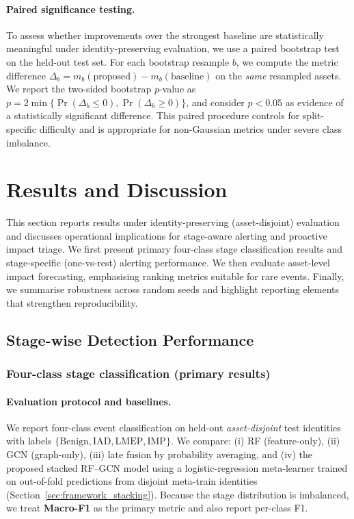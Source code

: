 \documentclass[pdflatex,sn-mathphys-num]{sn-jnl}
\theoremstyle{thmstyleone}%
\theoremstyle{thmstyletwo}%
\theoremstyle{thmstylethree}%
\begin{document}
\paragraph{Paired significance testing.}
To assess whether improvements over the strongest baseline are statistically meaningful under identity-preserving evaluation, we use a paired bootstrap test on the held-out test set.
For each bootstrap resample $b$, we compute the metric difference $\Delta_b = m_b(\text{proposed}) - m_b(\text{baseline})$ on the \emph{same} resampled assets.
We report the two-sided bootstrap $p$-value as
$p = 2\min\{\Pr(\Delta_b \le 0), \Pr(\Delta_b \ge 0)\}$,
and consider $p<0.05$ as evidence of a statistically significant difference.
This paired procedure controls for split-specific difficulty and is appropriate for non-Gaussian metrics under severe class imbalance.

\section{Results and Discussion}
\label{sec:6}

This section reports results under identity-preserving (asset-disjoint) evaluation and discusses operational implications for stage-aware alerting and proactive impact triage. We first present primary four-class stage classification results and stage-specific (one-vs-rest) alerting performance. We then evaluate asset-level impact forecasting, emphasising ranking metrics suitable for rare events. Finally, we summarise robustness across random seeds and highlight reporting elements that strengthen reproducibility.

\subsection{Stage-wise Detection Performance}
\label{sec:stagewise_discussion}

\subsubsection{Four-class stage classification (primary results)}
\label{subsec:main_4class_results}

\paragraph{Evaluation protocol and baselines.}
We report four-class event classification on held-out \emph{asset-disjoint} test identities with labels
$\{\text{Benign},\text{IAD},\text{LMEP},\text{IMP}\}$.
We compare: (i) RF (feature-only), (ii) GCN (graph-only), (iii) late fusion by probability averaging, and
(iv) the proposed stacked RF--GCN model using a logistic-regression meta-learner trained on out-of-fold predictions from disjoint meta-train identities (Section~\ref{sec:framework_stacking}).
Because the stage distribution is imbalanced, we treat \textbf{Macro-F1} as the primary metric and also report per-class F1.
\end{document}
